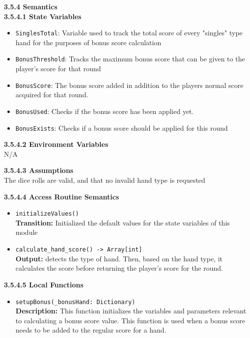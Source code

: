 \documentclass[12pt, titlepage]{article}
\begin{document}
\noindent \textbf{3.5.4 Semantics}\\
\textbf{3.5.4.1 State Variables}\\
\begin{itemize}
	\item \texttt{SinglesTotal}: Variable used to track the total score of every "singles" type hand for the purposes of bonus score calculation
    \item \texttt{BonusThreshold}: Tracks the maximum bonus score that can be given to the player's score for that round
    \item \texttt{BonusScore}: The bonus score added in addition to the players normal score acquired for that round.
    \item \texttt{BonusUsed}: Checks if the bonus score has been applied yet.
    \item \texttt{BonusExists}: Checks if a bonus score should be applied for this round
\end{itemize}

\textbf{3.5.4.2 Environment Variables}\\
N/A

\textbf{3.5.4.3 Assumptions}\\
The dice rolls are valid, and that no invalid hand type is requested

\textbf{3.5.4.4 Access Routine Semantics}
\begin{itemize}

	\item \texttt{initializeValues()}\\
	\textbf{Transition:} Initialized the default values for the state variables of this module
	
	\item \texttt{calculate\_hand\_score() -> Array[int]}\\
	\textbf{Output:} detects the type of hand. Then, based on the hand type, it calculates the score before returning the player's score for the round.
	

\end{itemize}

\textbf{3.5.4.5 Local Functions}
\begin{itemize}
    \item \texttt{setupBonus(\_bonusHand: Dictionary)}\\
    \textbf{Description:} This function initializes the variables and parameters relevant to calculating a bonus score value. This function is used when a bonus score needs to be added to the regular score for a hand.

\end{itemize}
\end{document}
